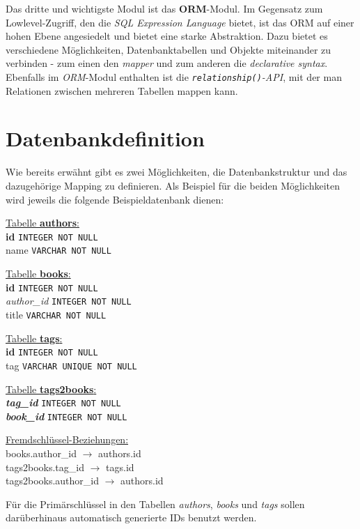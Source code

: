 Das dritte und wichtigste Modul ist das \textbf{ORM}-Modul. Im Gegensatz zum
Lowlevel-Zugriff, den die \emph{SQL Expression Language} bietet, ist das ORM auf
einer hohen Ebene angesiedelt und bietet eine starke Abstraktion. Dazu bietet es
verschiedene Möglichkeiten, Datenbanktabellen und Objekte miteinander zu
verbinden - zum einen den \emph{mapper} und zum anderen die \emph{declarative
syntax}. Ebenfalls im \emph{ORM}-Modul enthalten ist die
\emph{\texttt{relationship()}-API}, mit der man Relationen zwischen mehreren
Tabellen mappen kann.


\section{Datenbankdefinition}

Wie bereits erwähnt gibt es zwei Möglichkeiten, die Datenbankstruktur und das
dazugehörige Mapping zu definieren. Als Beispiel für die beiden Möglichkeiten
wird jeweils die folgende Beispieldatenbank dienen:

\ul{Tabelle \textbf{authors}:}\\
\textbf{id} \texttt{INTEGER NOT NULL}\\
name \texttt{VARCHAR NOT NULL}

\ul{Tabelle \textbf{books}:}\\
\textbf{id} \texttt{INTEGER NOT NULL}\\
\textit{author\_id} \texttt{INTEGER NOT NULL}\\
title \texttt{VARCHAR NOT NULL}

\ul{Tabelle \textbf{tags}:}\\
\textbf{id} \texttt{INTEGER NOT NULL}\\
tag \texttt{VARCHAR UNIQUE NOT NULL}

\ul{Tabelle \textbf{tags2books}:}\\
\textbf{\textit{tag\_id}} \texttt{INTEGER NOT NULL}\\
\textbf{\textit{book\_id}} \texttt{INTEGER NOT NULL}

\ul{Fremdschl\"ussel-Beziehungen:}\\
books.author\_id $\rightarrow$ authors.id\\
tags2books.tag\_id $\rightarrow$ tags.id\\
tags2books.author\_id $\rightarrow$ authors.id

Für die Primärschlüssel in den Tabellen \emph{authors}, \emph{books} und
\emph{tags} sollen darüberhinaus automatisch generierte IDs benutzt werden.

